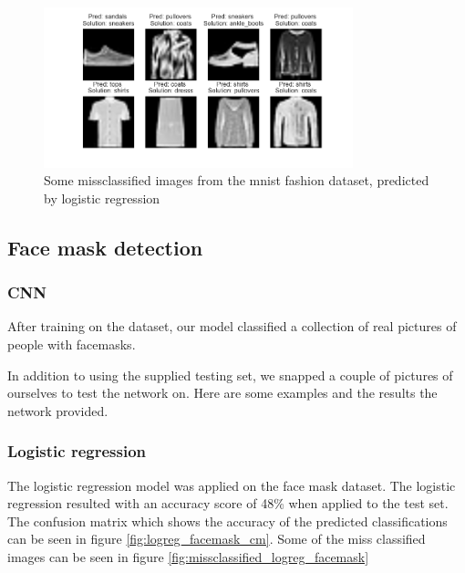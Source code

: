 \documentclass[../main.tex]{subfiles}
\begin{document}
\begin{figure}[H]
    \centering
    \includegraphics[width=0.8\textwidth]{doc/assets/logreg_missclassified_fasion.png}
    \caption{Some missclassified images from the mnist fashion dataset, predicted by logistic regression}
    \label{fig:missclassified_logreg_fashion}
\end{figure}

\subsection{Face mask detection}
\subsubsection{CNN}
After training on the dataset, our model classified a collection of real pictures of people with facemasks. 

In addition to using the supplied testing set, we snapped a couple of pictures of ourselves to test the network on. Here are some examples and the results the network provided.


\subsubsection{Logistic regression}
The logistic regression model was applied on the face mask dataset. The logistic regression resulted with an accuracy score of 48\% when applied to the test set. The confusion matrix which shows the accuracy of the predicted classifications can be seen in figure \ref{fig:logreg_facemask_cm}. Some of the miss classified images can be seen in figure \ref{fig:missclassified_logreg_facemask}
\end{document}
